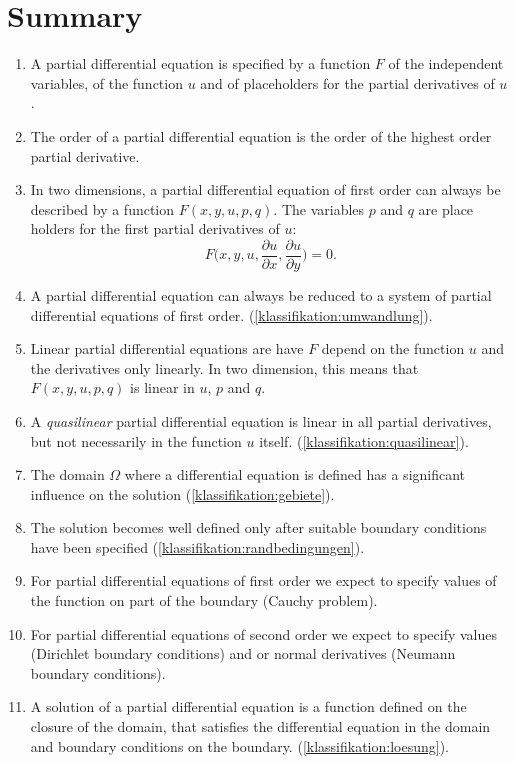 \section{Summary}
\begin{enumerate}
\item
A partial differential equation is specified by a function $F$
of the independent variables, of the function $u$ and of placeholders
for the partial derivatives of $u$.
\item
The order of a partial differential equation is the order of the
highest order partial derivative.
\item
In two dimensions, a partial differential equation of first order can
always be described by a function $F(x,y,u,p,q)$.
The variables $p$ and $q$ are place holders for the first partial
derivatives of $u$:
\[
F\biggl(
x,y, u,
\frac{\partial u}{\partial x},
\frac{\partial u}{\partial y}
\biggr)=0.
\]
\item
A partial differential equation can always be reduced to a system
of partial differential equations of first order.
(\ref{klassifikation:umwandlung}).
\item
{}
Linear partial differential equations are have $F$ depend on the function 
$u$ and the derivatives only linearly.
In two dimension, this means that $F(x,y,u,p,q)$ is linear in
$u$, $p$ and $q$.
\item
A {\em quasilinear} partial differential equation is linear in all
partial derivatives, but not necessarily in the function $u$ itself.
(\ref{klassifikation:quasilinear}).
\item
The domain $\Omega$ where a differential equation is defined
has a significant influence on the solution
(\ref{klassifikation:gebiete}).
\item
The solution becomes well defined only after suitable boundary conditions
have been specified
(\ref{klassifikation:randbedingungen}). 
\item
For partial differential equations of first order we expect to specify
values of the function on part of the boundary (Cauchy problem).
\item
For partial differential equations of second order we expect to
specify values (Dirichlet boundary conditions)
and or normal derivatives (Neumann boundary conditions).
\item
A solution of a partial differential equation is a function defined
on the closure of the domain, that satisfies the differential equation
in the domain and boundary conditions on the boundary.
(\ref{klassifikation:loesung}).
\end{enumerate}
